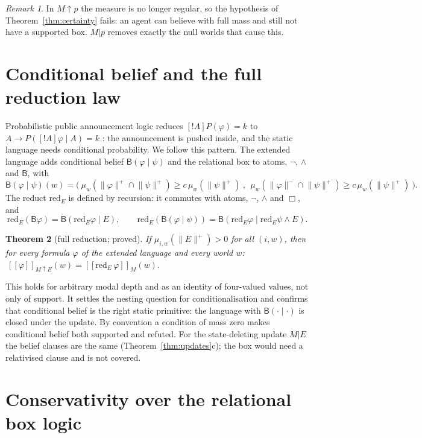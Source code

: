 \documentclass[11pt,a4paper]{article}
\newtheorem{theorem}{Theorem}[section]
\theoremstyle{definition}
\theoremstyle{remark}
\newtheorem{remark}[theorem]{Remark}
\newcommand{\Bel}{\mathsf{B}}
\newcommand{\pos}[1]{\lVert #1\rVert^{+}}
\newcommand{\negx}[1]{\lVert #1\rVert^{-}}
\begin{document}
\begin{remark}\label{rem:regular}
In $M\!\uparrow\!p$ the measure is no longer regular, so the hypothesis of
Theorem~\ref{thm:certainty} fails: an agent can believe with full mass and still not have
a supported box. $M|p$ removes exactly the null worlds that cause this.
\end{remark}

\section{Conditional belief and the full reduction law}\label{sec:cbel}

Probabilistic public announcement logic reduces
$[!A]P(\varphi)=k$ to $A\to P([!A]\varphi\mid A)=k$ \cite{vBGK2006}: the announcement is
pushed inside, and the static language needs conditional probability. We follow this
pattern. The extended language adds conditional belief $\Bel(\varphi\mid\psi)$ and the
relational box to atoms, $\neg$, $\wedge$ and $\Bel$, with
\[
\Bel(\varphi\mid\psi)(w)=\bigl(\ \mu_w(\pos{\varphi}\cap\pos{\psi})\ge c\,\mu_w(\pos{\psi})\ ,\ \
\mu_w(\negx{\varphi}\cap\pos{\psi})\ge c\,\mu_w(\pos{\psi})\ \bigr).
\]
The reduct $\mathrm{red}_E$ is defined by recursion: it commutes with atoms, $\neg$,
$\wedge$ and $\Box$, and
\[
\mathrm{red}_E(\Bel\varphi)=\Bel(\mathrm{red}_E\varphi\mid E),\qquad
\mathrm{red}_E(\Bel(\varphi\mid\psi))=\Bel(\mathrm{red}_E\varphi\mid \mathrm{red}_E\psi\wedge E).
\]

\begin{theorem}[full reduction; proved]\label{thm:fullred}
If $\mu_{i,w}(\pos{E})>0$ for all $(i,w)$, then for every formula $\varphi$ of the extended
language and every world $w$:
$\ [\![\varphi]\!]_{M\uparrow E}(w)=[\![\mathrm{red}_E\,\varphi]\!]_{M}(w)$.
\end{theorem}

This holds for arbitrary modal depth and as an identity of four-valued values, not only
of support. It settles the nesting question for conditionalisation and confirms that
conditional belief is the right static primitive: the language with $\Bel(\cdot\mid\cdot)$
is closed under the update. By convention a condition of mass zero makes conditional
belief both supported and refuted. For the state-deleting update $M|E$ the belief clauses
are the same (Theorem~\ref{thm:updates}c); the box would need a relativised clause and is
not covered.

\section{Conservativity over the relational box logic}\label{sec:cons}
\end{document}
